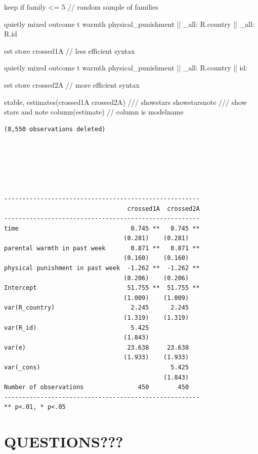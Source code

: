 \documentclass[
  letterpaper,
  DIV=11,
  numbers=noendperiod]{scrreprt}
\newenvironment{Shaded}{\begin{snugshade}}{\end{snugshade}}
\newcommand{\CommentTok}[1]{\textcolor[rgb]{0.37,0.37,0.37}{#1}}
\newcommand{\DataTypeTok}[1]{\textcolor[rgb]{0.68,0.00,0.00}{#1}}
\newcommand{\KeywordTok}[1]{\textcolor[rgb]{0.00,0.23,0.31}{#1}}
\newcommand{\NormalTok}[1]{\textcolor[rgb]{0.00,0.23,0.31}{#1}}
\begin{document}
\begin{Shaded}
\begin{Highlighting}[]

\KeywordTok{keep} \KeywordTok{if} \KeywordTok{family}\NormalTok{ \textless{}= 5 }\CommentTok{// random sample of families}
    
\KeywordTok{quietly}\NormalTok{ mixed outcome t warmth physical\_punishment || }\DataTypeTok{\_all}\NormalTok{: R.country || }\DataTypeTok{\_all}\NormalTok{: R.id}
    
\KeywordTok{est} \KeywordTok{store}\NormalTok{ crossed1A }\CommentTok{// less efficient syntax}
    
\KeywordTok{quietly}\NormalTok{ mixed outcome t warmth physical\_punishment || }\DataTypeTok{\_all}\NormalTok{: R.country || id:}
    
\KeywordTok{est} \KeywordTok{store}\NormalTok{ crossed2A }\CommentTok{// more efficient syntax}
    
\NormalTok{etable, }\KeywordTok{estimates}\NormalTok{(crossed1A crossed2A) }\CommentTok{///}
\NormalTok{showstars showstarsnote }\CommentTok{/// show stars and note}
\NormalTok{column(estimate) }\CommentTok{// column is modelname}
\end{Highlighting}
\end{Shaded}

\begin{verbatim}
(8,550 observations deleted)






------------------------------------------------------
                                  crossed1A  crossed2A
------------------------------------------------------
time                               0.745 **   0.745 **
                                 (0.281)    (0.281)   
parental warmth in past week       0.871 **   0.871 **
                                 (0.160)    (0.160)   
physical punishment in past week  -1.262 **  -1.262 **
                                 (0.206)    (0.206)   
Intercept                         51.755 **  51.755 **
                                 (1.009)    (1.009)   
var(R_country)                     2.245      2.245   
                                 (1.319)    (1.319)   
var(R_id)                          5.425              
                                 (1.843)              
var(e)                            23.638     23.638   
                                 (1.933)    (1.933)   
var(_cons)                                    5.425   
                                            (1.843)   
Number of observations               450        450   
------------------------------------------------------
** p<.01, * p<.05
\end{verbatim}

\section{QUESTIONS???}\label{questions}
\end{document}
